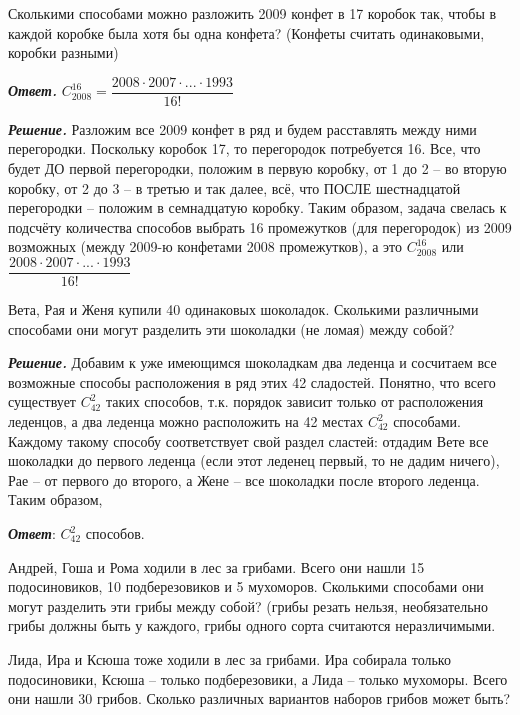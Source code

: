 \begin{thm}
    Сколькими способами можно разложить 2009 конфет в 17 коробок так, чтобы в каждой коробке была хотя бы одна конфета? (Конфеты считать одинаковыми, коробки разными)
    \par
    \textit{\textbf{Ответ.}} $C^{16}_{2008} = \dfrac{2008 \cdot 2007 \cdot ... \cdot 1993}{16!}$
    \par
    \textit{\textbf{Решение.}} Разложим все 2009 конфет в ряд и будем расставлять между ними перегородки. Поскольку коробок 17, то перегородок потребуется 16. Все, что будет ДО первой перегородки, положим в первую коробку, от 1 до 2 – во вторую коробку, от 2 до 3 – в третью и так далее, всё, что ПОСЛЕ шестнадцатой перегородки – положим в семнадцатую коробку. Таким образом, задача свелась к подсчёту количества способов выбрать 16 промежутков (для перегородок) из 2009 возможных (между 2009-ю конфетами 2008 промежутков), а это $C^{16}_{2008}$ или $\dfrac{2008 \cdot 2007 \cdot ... \cdot 1993}{16!}$
\end{thm}

\begin{thm}
    Вета, Рая и Женя купили 40 одинаковых шоколадок. Сколькими различными способами они могут разделить эти шоколадки (не ломая) между собой?
    \par
    \textit{\textbf{Решение.}} Добавим к уже имеющимся шоколадкам два леденца и сосчитаем все возможные способы расположения в ряд этих 42 сладостей. Понятно, что всего существует $C^2_{42}$ таких способов, т.к. порядок зависит только от расположения леденцов, а два леденца можно расположить на 42 местах $C^2_{42}$ способами. Каждому такому способу соответствует свой раздел сластей: отдадим Вете все шоколадки до первого леденца (если этот леденец первый, то не дадим ничего), Рае – от первого до второго, а Жене – все шоколадки после второго леденца. Таким образом, 
    \par
    \textit{\textbf{Ответ}}: $C^2_{42}$ способов.
\end{thm}

\begin{thm}
    Андрей, Гоша и Рома ходили в лес за грибами. Всего они нашли 15 подосиновиков, 10 подберезовиков и 5 мухоморов. Сколькими способами они могут разделить эти грибы между собой? (грибы резать нельзя, необязательно грибы должны быть у каждого, грибы одного сорта считаются неразличимыми.
\end{thm}

\begin{thm}
    Лида, Ира и Ксюша тоже ходили в лес за грибами. Ира собирала только подосиновики, Ксюша – только подберезовики, а Лида – только мухоморы. Всего они нашли 30 грибов. Сколько различных вариантов наборов грибов может быть?
\end{thm}

